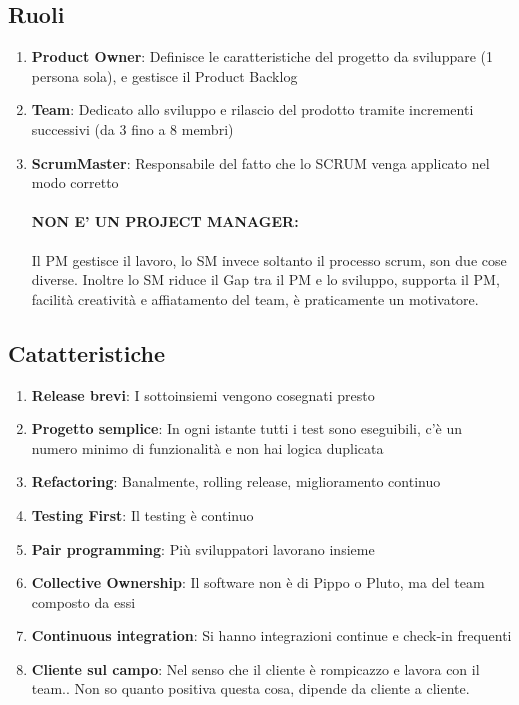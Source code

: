 \documentclass[12pt, a4paper, openany, twoside]{book}
\begin{document}
\subsection{Ruoli}
\begin{enumerate}
	\item \textbf{Product Owner}: Definisce le caratteristiche del progetto da 
	sviluppare (1 persona sola), e gestisce il Product Backlog
	\item \textbf{Team}: Dedicato allo sviluppo e rilascio del prodotto tramite
	incrementi successivi (da 3 fino a 8 membri)
	\item \textbf{ScrumMaster}: Responsabile del fatto che lo SCRUM venga applicato
	nel modo corretto
	\paragraph{NON E' UN PROJECT MANAGER:} Il PM gestisce il lavoro, lo SM invece
	soltanto il processo scrum, son due cose diverse. Inoltre lo SM riduce il Gap
	tra il PM e lo sviluppo, supporta il PM, facilità creatività e affiatamento
	del team, è praticamente un motivatore.
\end{enumerate}
\subsection{Catatteristiche}
\begin{enumerate}
	\item \textbf{Release brevi}: I sottoinsiemi vengono cosegnati presto
	\item \textbf{Progetto semplice}: In ogni istante tutti i test sono eseguibili,
	c'è un numero minimo di funzionalità e non hai logica duplicata
	\item \textbf{Refactoring}: Banalmente, rolling release, miglioramento continuo
	\item \textbf{Testing First}: Il testing è continuo
	\item \textbf{Pair programming}: Più sviluppatori lavorano insieme
	\item \textbf{Collective Ownership}: Il software non è di Pippo o Pluto, ma 
	del team composto da essi
	\item \textbf{Continuous integration}: Si hanno integrazioni continue e check-in
	frequenti
	\item \textbf{Cliente sul campo}: Nel senso che il cliente è rompicazzo e 
	lavora con il team.. Non so quanto positiva questa cosa, dipende da cliente
	a cliente.
\end{enumerate}
\end{document}
